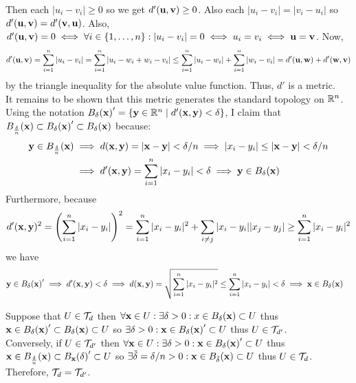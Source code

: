 \documentclass[12pt]{extarticle}
\begin{document}
Then each $|u_i - v_i| \ge 0$ so we get $d'(\bf{u}, \bf{v}) \ge 0$. Also each $|u_i - v_i| = |v_i - u_i|$ so $d'(\bf{u}, \bf{v}) = d'(\bf{v}, \bf{u})$.
Also, $d'(\bf{u}, \bf{v}) = 0 \iff \forall i \in \{1, \dots, n\} : |u_i - v_i| = 0 \iff u_i = v_i \iff \bf{u} = \bf{v}$.
Now, \[d'(\bf{u}, \bf{v}) = \sum\limits_{i = 1}^{n} |u_i - v_i| = \sum\limits_{i = 1}^{n} |u_i - w_i + w_i - v_i| \le \sum\limits_{i = 1}^{n} |u_i - w_i| + \sum\limits_{i = 1}^{n} |w_i - v_i| = d'(\bf{u}, \bf{w}) + d'(\bf{w}, \bf{v}) \]
by the triangle inequality for the absolute value function. Thus, $d'$ is a metric. \bigskip \\ It remains to be shown that this metric generates the standard topology on $\R^n$. Using the notation $\ball{\delta}{\bf{x}}' = \{ \bf{y} \in \R^n \mid d'(\bf{x}, \bf{y}) < \delta\}$, I claim that $\ball{\frac{\delta}{n}}{\bf{x}} \subset \ball{\delta}{\bf{x}}' \subset \ball{\delta}{\bf{x}}$ because:
\begin{align*}
\bf{y} \in \ball{\frac{\delta}{n}}{\bf{x}} & \implies d(\bf{x}, \bf{y}) = |\bf{x} - \bf{y}| < \delta/n \implies |x_i - y_i| \le |\bf{x} - \bf{y}| < \delta/n \\ & \implies d'(\bf{x}, \bf{y}) = \sum\limits_{i = 1}^{n} |x_i - y_i| < \delta \implies \bf{y} \in \ball{\delta}{\bf{x}}
\end{align*}
Furthermore, because 
\[d'(\bf{x}, \bf{y})^2 = \left( \sum\limits_{i = 1}^{n} |x_i - y_i| \right)^2 = \sum\limits_{i = 1}^{n} |x_i - y_i|^2  + \sum\limits_{i \neq j} |x_i - y_i| |x_j - y_j| \ge \sum\limits_{i = 1}^{n} |x_i - y_i|^2 \]
we have
\begin{align*}
\bf{y} \in \ball{\delta}{\bf{x}}' & \implies d'(\bf{x}, \bf{y}) < \delta \implies d(\bf{x}, \bf{y}) = \sqrt{\sum\limits_{i = 1}^{n} |x_i - y_i|^2} \le \sum\limits_{i = 1}^{n} |x_i - y_i| < \delta \implies \bf{x} \in \ball{\delta}{\bf{x}}
\end{align*}

Suppose that $U \in \topo_{d}$ then $\forall \bf{x} \in U : \exists \delta > 0 : x \in \ball{\delta}{\bf{x}} \subset U$ thus $\bf{x} \in \ball{\delta}{\bf{x}}' \subset \ball{\delta}{\bf{x}} \subset U$ so $\exists \delta > 0 : \bf{x} \in \ball{\delta}{\bf{x}}' \subset U$ thus $U \in \topo_{d'}$. \bigskip \\
Conversely, if $U \in \topo_{d'}$ then $\forall \bf{x} \in U : \exists \delta > 0 : \bf{x} \in \ball{\delta}{\bf{x}}' \subset U$ thus $\bf{x} \in \ball{\frac{\delta}{n}}{\bf{x}} \subset \ball{\bf{x}}{\delta}' \subset U$ so $\exists \tilde{\delta} = \delta/n > 0 : \bf{x} \in \ball{\tilde{\delta}}{\bf{x}} \subset U$ thus $U \in \topo_{d}$. Therefore, $\topo_{d} = \topo_{d'}$.  
\end{document}
